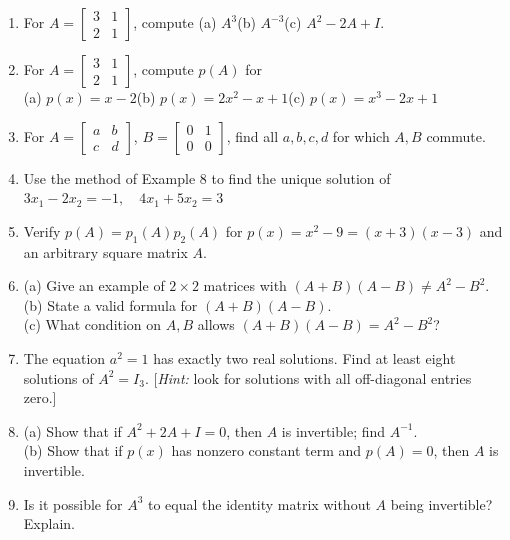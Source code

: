 \documentclass{article}
\theoremstyle{mystyle}
\begin{document}
\begin{enumerate}
    \item[19.] For $A=\begin{bmatrix}3&1\\2&1\end{bmatrix}$, compute (a) $A^3$\quad (b) $A^{-3}$\quad (c) $A^2-2A+I$.

    \item[21.] For $A=\begin{bmatrix}3&1\\2&1\end{bmatrix}$, compute $p(A)$ for\\
    (a) $p(x)=x-2$\quad (b) $p(x)=2x^2-x+1$\quad (c) $p(x)=x^3-2x+1$

    \item[23.] For $A=\begin{bmatrix}a&b\\c&d\end{bmatrix}$, $B=\begin{bmatrix}0&1\\0&0\end{bmatrix}$, find all $a,b,c,d$ for which $A,B$ commute.

    \item[25.] Use the method of Example 8 to find the unique solution of\\
    $3x_1-2x_2=-1,\quad 4x_1+5x_2=3$

    \item[30.] Verify $p(A)=p_1(A)p_2(A)$ for $p(x)=x^2-9=(x+3)(x-3)$ and an arbitrary square matrix $A$.

    \item[31.] (a) Give an example of $2\times2$ matrices with $(A+B)(A-B)\ne A^2-B^2$.\\
    (b) State a valid formula for $(A+B)(A-B)$.\\
    (c) What condition on $A,B$ allows $(A+B)(A-B)=A^2-B^2$?

    \item[32.] The equation $a^2=1$ has exactly two real solutions. Find at least eight solutions of $A^2=I_3$. [\emph{Hint:} look for solutions with all off-diagonal entries zero.]

    \item[33.] (a) Show that if $A^2+2A+I=0$, then $A$ is invertible; find $A^{-1}$.\\
    (b) Show that if $p(x)$ has nonzero constant term and $p(A)=0$, then $A$ is invertible.

    \item[34.] Is it possible for $A^3$ to equal the identity matrix without $A$ being invertible? Explain.


\end{enumerate}
\end{document}
